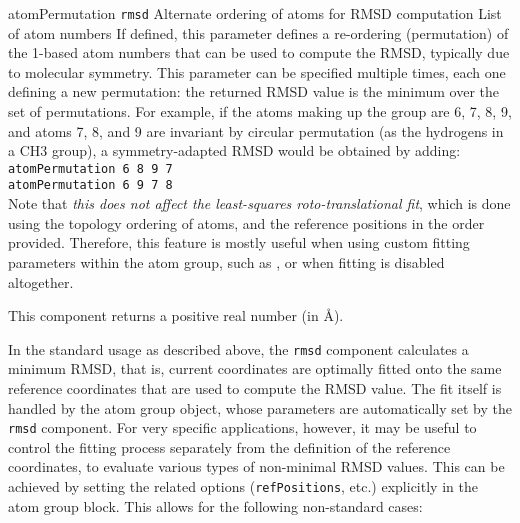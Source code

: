 \begin{cvcoptions}
\item %
  \key
    {atomPermutation}{%
    \texttt{rmsd}}{%
    Alternate ordering of atoms for RMSD computation}{%
    List of atom numbers}{%
    If defined, this parameter defines a re-ordering (permutation) of the 1-based atom numbers that
    can be used to compute the RMSD, typically due to molecular symmetry.
    This parameter can be specified multiple times, each one defining a new permutation:
    the returned RMSD value is the minimum over the set of permutations.
    For example, if the atoms making up the group are 6, 7, 8, 9, and atoms 7, 8, and 9
    are invariant by circular permutation (as the hydrogens in a CH3 group), a
    symmetry-adapted RMSD would be obtained by adding:\\
    \texttt{atomPermutation 6 8 9 7}\\
    \texttt{atomPermutation 6 9 7 8}\\
    Note that \textit{this does not affect the least-squares roto-translational fit},
    which is done using the topology ordering of atoms, and the reference
    positions in the order provided.
    Therefore, this feature is mostly useful when using custom fitting parameters within the
    atom group, such as , or when fitting
    is disabled altogether.
  }
\end{cvcoptions}
This component returns a positive real number (in \AA).


In the standard usage as described above, the \texttt{rmsd} component
calculates a minimum RMSD, that is, current coordinates are optimally
fitted onto the same reference coordinates that are used to
compute the RMSD value. The fit itself is handled by the atom group
object, whose parameters are automatically set by the \texttt{rmsd}
component.
For very specific applications, however, it may be
useful to control the fitting process separately from the definition
of the reference coordinates, to evaluate various types of
non-minimal RMSD values. This can be achieved by setting the
related options (\texttt{refPositions}, etc.) explicitly in the
atom group block. This allows for the following non-standard cases:

